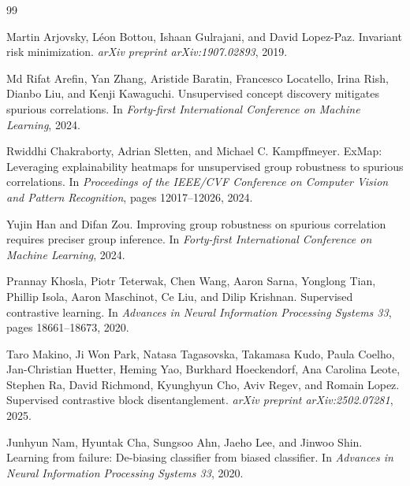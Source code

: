 \documentclass{article}
\begin{document}
\begin{thebibliography}{99}

Martin Arjovsky, L{\'e}on Bottou, Ishaan Gulrajani, and David Lopez-Paz.
\newblock Invariant risk minimization.
\newblock \emph{arXiv preprint arXiv:1907.02893}, 2019.

Md Rifat Arefin, Yan Zhang, Aristide Baratin, Francesco Locatello, Irina Rish, Dianbo Liu, and Kenji Kawaguchi.
\newblock Unsupervised concept discovery mitigates spurious correlations.
\newblock In \emph{Forty-first International Conference on Machine Learning}, 2024.

Rwiddhi Chakraborty, Adrian Sletten, and Michael C. Kampffmeyer.
\newblock ExMap: Leveraging explainability heatmaps for unsupervised group robustness to spurious correlations.
\newblock In \emph{Proceedings of the IEEE/CVF Conference on Computer Vision and Pattern Recognition}, pages 12017--12026, 2024.

Yujin Han and Difan Zou.
\newblock Improving group robustness on spurious correlation requires preciser group inference.
\newblock In \emph{Forty-first International Conference on Machine Learning}, 2024.

Prannay Khosla, Piotr Teterwak, Chen Wang, Aaron Sarna, Yonglong Tian, Phillip Isola, Aaron Maschinot, Ce Liu, and Dilip Krishnan.
\newblock Supervised contrastive learning.
\newblock In \emph{Advances in Neural Information Processing Systems 33}, pages 18661--18673, 2020.

Taro Makino, Ji Won Park, Natasa Tagasovska, Takamasa Kudo, Paula Coelho, Jan-Christian Huetter, Heming Yao, Burkhard Hoeckendorf, Ana Carolina Leote, Stephen Ra, David Richmond, Kyunghyun Cho, Aviv Regev, and Romain Lopez.
\newblock Supervised contrastive block disentanglement.
\newblock \emph{arXiv preprint arXiv:2502.07281}, 2025.

Junhyun Nam, Hyuntak Cha, Sungsoo Ahn, Jaeho Lee, and Jinwoo Shin.
\newblock Learning from failure: De-biasing classifier from biased classifier.
\newblock In \emph{Advances in Neural Information Processing Systems 33}, 2020.


\end{thebibliography}
\end{document}
